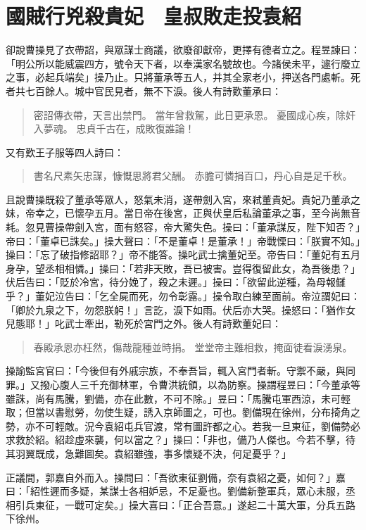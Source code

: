 
\chapter{國賊行兇殺貴妃　皇叔敗走投袁紹}

卻說曹操見了衣帶詔，與眾謀士商議，欲廢卻獻帝，更擇有德者立之。程昱諫曰：「明公所以能威震四方，號令天下者，以奉漢家名號故也。今諸侯未平，遽行廢立之事，必起兵端矣」操乃止。只將董承等五人，并其全家老小，押送各門處斬。死者共七百餘人。城中官民見者，無不下淚。後人有詩歎董承曰：

\begin{quote}
密詔傳衣帶，天言出禁門。
當年曾救駕，此日更承恩。
憂國成心疾，除奸入夢魂。
忠貞千古在，成敗復誰論！
\end{quote}

又有歎王子服等四人詩曰：

\begin{quote}
書名尺素矢忠謀，慷慨思將君父酬。
赤膽可憐捐百口，丹心自是足千秋。
\end{quote}

且說曹操既殺了董承等眾人，怒氣未消，遂帶劍入宮，來弒董貴妃。貴妃乃董承之妹，帝幸之，已懷孕五月。當日帝在後宮，正與伏皇后私論董承之事，至今尚無音耗。忽見曹操帶劍入宮，面有怒容，帝大驚失色。操曰：「董承謀反，陛下知否？」帝曰：「董卓已誅矣。」操大聲曰：「不是董卓！是董承！」帝戰慄曰：「朕實不知。」操曰：「忘了破指修詔耶？」帝不能答。操叱武士擒董妃至。帝告曰：「董妃有五月身孕，望丞相相憐。」操曰：「若非天敗，吾已被害。豈得復留此女，為吾後患？」伏后告曰：「貶於冷宮，待分娩了，殺之未遲。」操曰：「欲留此逆種，為母報讎乎？」董妃泣告曰：「乞全屍而死，勿令彰露。」操令取白練至面前。帝泣謂妃曰：「卿於九泉之下，勿怨朕躬！」言訖，淚下如雨。伏后亦大哭。操怒曰：「猶作女兒態耶！」叱武士牽出，勒死於宮門之外。後人有詩歎董妃曰：

\begin{quote}
春殿承恩亦枉然，傷哉龍種並時捐。
堂堂帝主難相救，掩面徒看淚湧泉。
\end{quote}

操諭監宮官曰：「今後但有外戚宗族，不奉吾旨，輒入宮門者斬。守禦不嚴，與同罪。」又撥心腹人三千充御林軍，令曹洪統領，以為防察。操謂程昱曰：「今董承等雖誅，尚有馬騰，劉備，亦在此數，不可不除。」昱曰：「馬騰屯軍西涼，未可輕取；但當以書慰勞，勿使生疑，誘入京師圖之，可也。劉備現在徐州，分布掎角之勢，亦不可輕敵。況今袁紹屯兵官渡，常有圖許都之心。若我一旦東征，劉備勢必求救於紹。紹趁虛來襲，何以當之？」操曰：「非也，備乃人傑也。今若不擊，待其羽翼既成，急難圖矣。袁紹雖強，事多懷疑不決，何足憂乎？」

正議間，郭嘉自外而入。操問曰：「吾欲東征劉備，奈有袁紹之憂，如何？」嘉曰：「紹性遲而多疑，某謀士各相妒忌，不足憂也。劉備新整軍兵，眾心未服，丞相引兵東征，一戰可定矣。」操大喜曰：「正合吾意。」遂起二十萬大軍，分兵五路下徐州。


